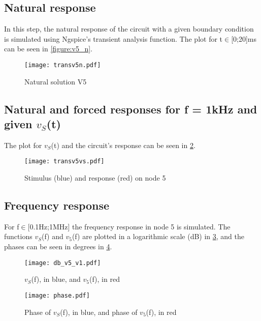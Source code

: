 \subsection{Natural response}

In this step, the natural response of the circuit with a given boundary condition is simulated using Ngspice's transient analysis function. The plot for t$\in$[0;20]ms can be seen in \ref{figure:v5_n}. %

\begin{figure}[h] \centering
\texttt{[image: transv5n.pdf]}
\caption{Natural solution V5}
\label{fig:v5_n}
\end{figure}
\FloatBarrier

\subsection{Natural and forced responses for f = 1kHz and given $v_S$(t)}

The plot for $v_S$(t) and the circuit's response can be seen in \ref{fig:transv5vs.pdf}.

\begin{figure}[h] \centering
\texttt{[image: transv5vs.pdf]}
\caption{Stimulus (blue) and response (red) on node 5}
\label{fig:transv5vs.pdf}
\end{figure}
\FloatBarrier

\subsection{Frequency response}

For f$\in$[0.1Hz;1MHz] the frequency response in node 5 is simulated. The functions $v_S$(f) and $v_5$(f) are plotted in a logarithmic scale (dB) in \ref{fig:db_v5_v1.pdf}, and the phases can be seen in degrees in \ref{fig:phase.pdf}. 

\begin{figure}[h] \centering
\texttt{[image: db\_v5\_v1.pdf]}
\caption{$v_S$(f), in blue, and $v_5$(f), in red}
\label{fig:db_v5_v1.pdf}
\end{figure}
\FloatBarrier

\begin{figure}[h] \centering
\texttt{[image: phase.pdf]}
\caption{Phase of $v_S$(f), in blue, and phase of $v_5$(f), in red}
\label{fig:phase.pdf}
\end{figure}
\FloatBarrier
